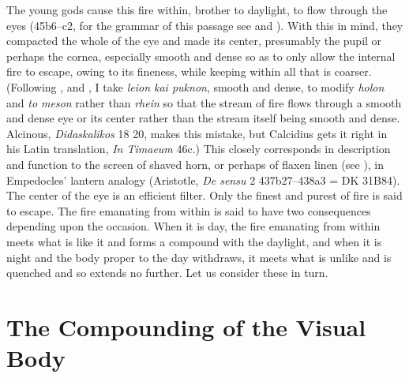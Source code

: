 The young gods cause this fire within, brother to daylight, to flow through the eyes (45b6--c2, for the grammar of this passage see \citealt[63 123--127]{Cook-Wilson:1889cs} and \citealt[277]{Taylor:1928qb}). With this in mind, they compacted the whole of the eye and made its center, presumably the pupil or perhaps the cornea, especially smooth and dense so as to only allow the internal fire to escape, owing to its fineness, while keeping within all that is coarser. (Following \citealt[125--6]{Cook-Wilson:1889cs}, \citealt[277]{Taylor:1928qb} and \citealt[152]{Cornford:1935fk}, I take \emph{leion kai puknon}, smooth and dense, to modify \emph{holon} and \emph{to meson} rather than \emph{rhein} so that the stream of fire flows through a smooth and dense eye or its center rather than the stream itself being smooth and dense. Alcinous, \emph{Didaskalikos} 18 20, makes this mistake, but Calcidius gets it right in his Latin translation, \emph{In Timaeum} 46c.) This closely corresponds in description and function to the screen of shaved horn, or perhaps of flaxen linen (see \citealt[240--1]{Wright:1981zr}), in Empedocles' lantern analogy (Aristotle, \emph{De sensu} 2 437b27–438a3 = DK 31B84). The center of the eye is an efficient filter. Only the finest and purest of fire is said to escape. The fire emanating from within is said to have two consequences depending upon the occasion. When it is day, the fire emanating from within meets what is like it and forms a compound with the daylight, and when it is night and the body proper to the day withdraws, it meets what is unlike and is quenched and so extends no further. Let us consider these in turn.


\section{The Compounding of the Visual Body} %
\label{sec:the_compounding_of_the_visual_body}

